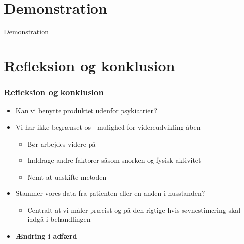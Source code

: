 \section{Demonstration}
\begin{frame}
	Demonstration
\end{frame}


\section{Refleksion og konklusion}
\begin{frame}
\frametitle{Refleksion og konklusion}
\begin{itemize}
	\item Kan vi benytte produktet udenfor psykiatrien?
	\item Vi har ikke begrænset os - mulighed for videreudvikling åben
	\begin{itemize}
		\item Bør arbejdes videre på
		\item Inddrage andre faktorer såsom snorken og fysisk aktivitet
		\item Nemt at udskifte metoden
	\end{itemize}
	\item Stammer vores data fra patienten eller en anden i husstanden?
	\begin{itemize}
		\item Centralt at vi måler præcist og på den rigtige hvis søvnestimering skal indgå i behandlingen
	\end{itemize}
	\item \textbf{Ændring i adfærd}
\end{itemize}
\end{frame}

